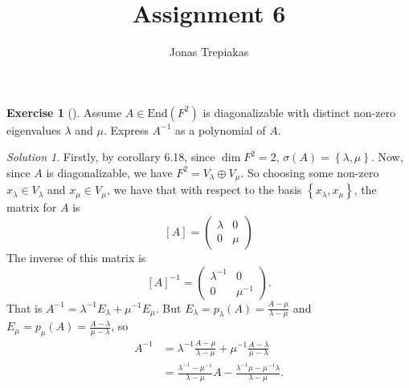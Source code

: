 \documentclass[reqno]{amsart}
\title{Assignment 6}
\author{Jonas Trepiakas}
\theoremstyle{definition}
\newtheorem{exercise}[theorem]{Exercise}
\theoremstyle{remark}
\newtheorem*{solution}{Solution}
\newcommand{\End}{{\mathrm{End}}}
\begin{document}
\maketitle

    \begin{exercise}[]
        Assume $A \in \End (F^2)$ is diagonalizable with
        distinct non-zero eigenvalues $\lambda $ and
        $\mu$. Express $A^{-1}$ as a polynomial of $A$.
    \end{exercise}

    \begin{solution}
        Firstly, by corollary 6.18, since
        $\dim F^2 = 2$, $\sigma (A) = \left\{ \lambda, \mu \right\} $.
        Now, since $A$ is diagonalizable, we have
        $F^2 = V_{\lambda} \oplus V_{\mu} 
        $.
        So
        choosing some non-zero $x_{\lambda} \in V_{\lambda}$ 
        and $x_{\mu} \in V_{\mu}$, we have that with respect
        to the basis $\left\{ x_{\lambda}, x_{\mu} \right\} $,
        the matrix for $A$ is
        \[
        \left[ A \right] =
        \begin{pmatrix} \lambda & 0 \\ 0 & \mu \end{pmatrix} 
        \] 
        The inverse of this matrix is
        \[
        \left[ A \right]^{-1} = 
        \begin{pmatrix} \lambda^{-1} & 0 \\ 0 & \mu^{-1} \end{pmatrix}. 
        \] 
        That is
        $A^{-1} = \lambda^{-1} E_{\lambda} +
        \mu^{-1} E_{\mu}$.
        But $E_{\lambda} = p_{\lambda}(A)
        = \frac{A -\mu}{\lambda - \mu}$ 
        and
        $E_{\mu} = p_{\mu}(A)
        = \frac{A - \lambda}{\mu - \lambda}$, so
        \begin{align*}
            A^{-1} 
            &=\lambda^{-1} \frac{A - \mu}{\lambda - \mu} +
            \mu^{-1} \frac{A - \lambda}{\mu - \lambda} \\
            &= \frac{\lambda^{-1} - \mu^{-1}}{\lambda - \mu}A
            - \frac{\lambda^{-1} \mu - \mu^{-1} \lambda }{\lambda
            - \mu}.
        \end{align*}
    \end{solution}



















\end{document}
